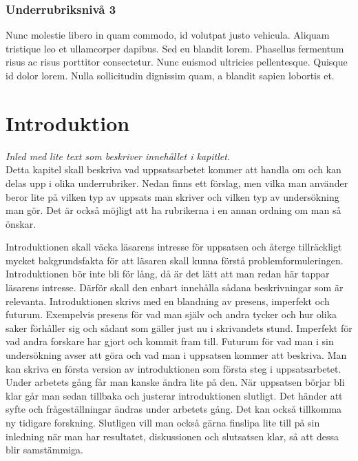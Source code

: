 \documentclass[a4paper,12pt]{article} %
\begin{document}
\subsubsection{Underrubriksnivå 3}
Nunc molestie libero in quam commodo, id volutpat justo vehicula. Aliquam tristique leo et ullamcorper dapibus. Sed eu blandit lorem. Phasellus fermentum risus ac risus porttitor consectetur. Nunc euismod ultricies pellentesque. Quisque id dolor lorem. Nulla sollicitudin dignissim quam, a blandit sapien lobortis et.

\section{Introduktion}
\emph{Inled med lite text som beskriver innehållet i kapitlet.}\\
Detta kapitel skall beskriva vad uppsatsarbetet kommer att handla om och kan delas upp i olika underrubriker. Nedan finns ett förslag, men vilka man använder beror lite på vilken typ av uppsats man skriver och vilken typ av undersökning man gör. Det är också möjligt att ha rubrikerna i en annan ordning om man så önskar.

Introduktionen skall väcka läsarens intresse för uppsatsen och återge tillräckligt mycket bakgrundsfakta för att läsaren skall kunna förstå problemformuleringen. Introduktionen bör inte bli för lång, då är det lätt att man redan här tappar läsarens intresse. Därför skall den enbart innehålla sådana beskrivningar som är relevanta.
Introduktionen skrivs med en blandning av presens, imperfekt och futurum. Exempelvis presens för vad man själv och andra tycker och hur olika saker förhåller sig och sådant som gäller just nu i skrivandets stund. Imperfekt för vad andra forskare har gjort och kommit fram till. Futurum för vad man i sin undersökning avser att göra och vad man i uppsatsen kommer att beskriva.
Man kan skriva en första version av introduktionen som första steg i uppsatsarbetet. Under arbetets gång får man kanske ändra lite på den. När uppsatsen börjar bli klar går man sedan tillbaka och justerar introduktionen slutligt. Det händer att syfte och frågeställningar ändras under arbetets gång. Det kan också tillkomma ny tidigare forskning. Slutligen vill man också gärna finslipa lite till på sin inledning när man har resultatet, diskussionen och slutsatsen klar, så att dessa blir samstämmiga.
\end{document}
